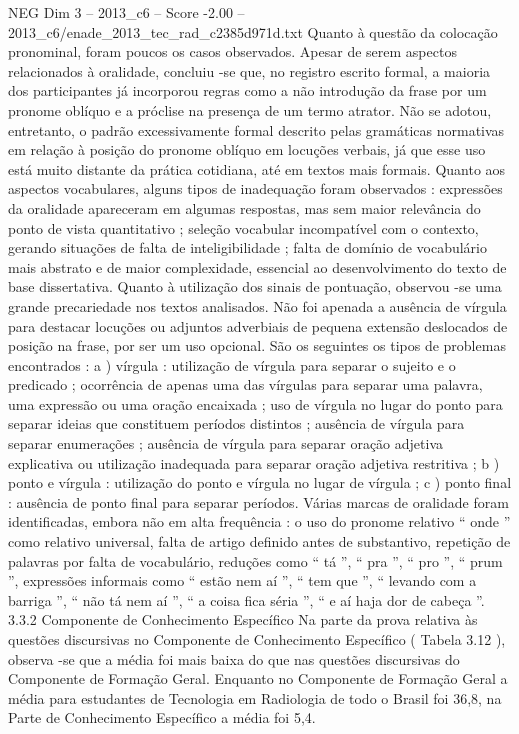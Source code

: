 \begin{textsample}{NEG Dim 3 – 2013\_c6 – Score -2.00 – 2013\_c6/enade\_2013\_tec\_rad\_c2385d971d.txt}
Quanto à questão da colocação pronominal, foram poucos os casos observados.
Apesar de serem aspectos relacionados à oralidade, concluiu -se que, no registro escrito formal, a maioria dos participantes já incorporou regras como a não introdução da frase por um pronome oblíquo e a próclise na presença de um termo atrator.
Não se adotou, entretanto, o padrão excessivamente formal descrito pelas gramáticas normativas em relação à posição do pronome oblíquo em locuções verbais, já que esse uso está muito distante da prática cotidiana, até em textos mais formais.
Quanto aos aspectos vocabulares, alguns tipos de inadequação foram observados : expressões da oralidade apareceram em algumas respostas, mas sem maior relevância do ponto de vista quantitativo ; seleção vocabular incompatível com o contexto, gerando situações de falta de inteligibilidade ; falta de domínio de vocabulário mais abstrato e de maior complexidade, essencial ao desenvolvimento do texto de base dissertativa.
Quanto à utilização dos sinais de pontuação, observou -se uma grande precariedade nos textos analisados.
Não foi apenada a ausência de vírgula para destacar locuções ou adjuntos adverbiais de pequena extensão deslocados de posição na frase, por ser um uso opcional.
São os seguintes os tipos de problemas encontrados : a ) vírgula : utilização de vírgula para separar o sujeito e o predicado ; ocorrência de apenas uma das vírgulas para separar uma palavra, uma expressão ou uma oração encaixada ; uso de vírgula no lugar do ponto para separar ideias que constituem períodos distintos ; ausência de vírgula para separar enumerações ; ausência de vírgula para separar oração adjetiva explicativa ou utilização inadequada para separar oração adjetiva restritiva ; b ) ponto e vírgula : utilização do ponto e vírgula no lugar de vírgula ; c ) ponto final : ausência de ponto final para separar períodos.
Várias marcas de oralidade foram identificadas, embora não em alta frequência : o uso do pronome relativo “ onde ” como relativo universal, falta de artigo definido antes de substantivo, repetição de palavras por falta de vocabulário, reduções como “ tá ”, “ pra ”, “ pro ”, “ prum ”, expressões informais como “ estão nem aí ”, “ tem que ”, “ levando com a barriga ”, “ não tá nem aí ”, “ a coisa fica séria ”, “ e aí haja dor de cabeça ”. 3.3.2 Componente de Conhecimento Específico Na parte da prova relativa às questões discursivas no Componente de Conhecimento Específico ( Tabela 3.12 ), observa -se que a média foi mais baixa do que nas questões discursivas do Componente de Formação Geral.
Enquanto no Componente de Formação Geral a média para estudantes de Tecnologia em Radiologia de todo o Brasil foi 36,8, na Parte de Conhecimento Específico a média foi 5,4.

\end{textsample}
